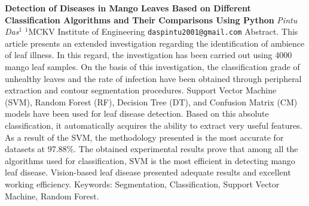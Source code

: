 
    \begin{conf-abstract}[]
        {\textbf{Detection of Diseases in Mango Leaves Based on Different Classification Algorithms and Their Comparisons Using Python}}
        {\textit{Pintu Das$^{1}$}}
        {$^{1}$MCKV Institute of Engineering}
        {\texttt{daspintu2001@gmail.com}}
        {Abstract. This article presents an extended investigation regarding the identification of ambience of leaf illness. In this regard, the investigation has been carried out using 4000 mango leaf samples. On the basis of this investigation, the classification grade of unhealthy leaves and the rate of infection have been obtained through peripheral extraction and contour segmentation procedures. Support Vector Machine (SVM), Random Forest (RF), Decision Tree (DT), and Confusion Matrix (CM) models have been used for leaf disease detection. Based on this absolute classification, it automatically acquires the ability to extract very useful features. As a result of the SVM, the methodology presented is the most accurate for datasets at 97.88\%. The obtained experimental results prove that among all the algorithms used for classification, SVM is the most efficient in detecting mango leaf disease. Vision-based leaf disease presented adequate results and excellent working efficiency.  Keywords: Segmentation, Classification, Support Vector Machine, Random Forest. }
    \end{conf-abstract}
        